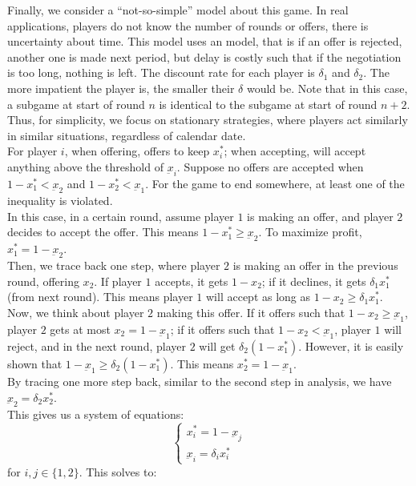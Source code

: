 Finally, we consider a ``not-so-simple'' model about this game. In real applications, players do not know the number of rounds or offers, there is uncertainty about time. This model uses an  model, that is if an offer is rejected, another one is made next period, but delay is costly such that if the negotiation is too long, nothing is left. The discount rate for each player is $\delta_1$ and $\delta_2$. The more impatient the player is, the smaller their $\delta$ would be. Note that in this case, a subgame at start of round $n$ is identical to the subgame at start of round $n + 2$. Thus, for simplicity, we focus on stationary strategies, where players act similarly in similar situations, regardless of calendar date. \\
For player $i$, when offering, offers to keep $x_i^*$; when accepting, will accept anything above the threshold of $\underbar{x}_i$. Suppose no offers are accepted when $1 - x_1^* < \underbar{x}_2$ and $1 - x_2^* < \underbar{x}_1$. For the game to end somewhere, at least one of the inequality is violated. \\
In this case, in a certain round, assume player $1$ is making an offer, and player $2$ decides to accept the offer. This means $1 - x_1^* \ge \underbar{x}_2$. To maximize profit, $x_1^* = 1 - \underbar{x}_2$. \\
Then, we trace back one step, where player $2$ is making an offer in the previous round, offering $x_2$. If player $1$ accepts, it gets $1 - x_2$; if it declines, it gets $\delta_1 x_1^*$ (from next round). This means player $1$ will accept as long as $1 - x_2 \ge \delta_1 x_1^*$. \\
Now, we think about player $2$ making this offer. If it offers such that $1 - x_2 \ge \underbar{x}_1$, player $2$ gets at most $x_2 = 1 - \underbar{x}_1$; if it offers such that $1 - x_2 < \underbar{x}_1$, player $1$ will reject, and in the next round, player $2$ will get $\delta_2 (1 - x_1^*)$. However, it is easily shown that $1 - \underbar{x}_1 \ge \delta_2 (1 - x_1^*)$. This means $x_2^* = 1 - \underbar{x}_1$. \\
By tracing one more step back, similar to the second step in analysis, we have $\underbar{x}_2 = \delta_2 x_2^*$. \\
This gives us a system of equations:
$$\begin{cases}
    x_i^* = 1 - \underbar{x}_j \\
    \underbar{x}_i = \delta_i x_i^*
\end{cases}$$
for $i, j \in \{1, 2\}$. This solves to:
